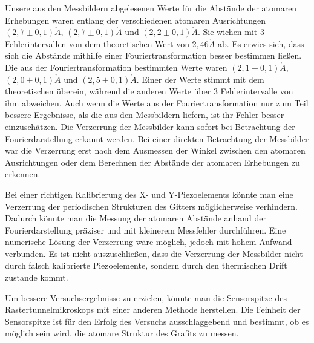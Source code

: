 \documentclass[10pt,a4paper]{article}
\begin{document}
Unsere aus den Messbildern abgelesenen Werte für die Abstände der atomaren Erhebungen waren entlang der verschiedenen atomaren Ausrichtungen $(2,7 \pm 0,1) \mathring{A}$, $(2,7 \pm 0,1) \mathring{A}$ und $(2,2 \pm 0,1) \mathring{A}$. Sie wichen mit 3 Fehlerintervallen von dem theoretischen Wert von $2,46 \mathring{A}$ ab. Es erwies sich, dass sich die Abstände mithilfe einer Fouriertransformation besser bestimmen ließen. Die aus der Fouriertransformation bestimmten Werte waren $(2,1\pm0,1)\mathring{A}$, $(2,0\pm0,1)\mathring{A}$ und $(2,5\pm0,1)\mathring{A}$. Einer der Werte stimmt mit dem theoretischen überein, während die anderen Werte über 3 Fehlerintervalle von ihm abweichen.
 Auch wenn die Werte aus der Fouriertransformation nur zum Teil bessere Ergebnisse, als die aus den Messbildern liefern, ist ihr Fehler besser einzuschätzen. Die Verzerrung der Messbilder kann sofort bei Betrachtung der Fourierdarstellung erkannt werden. Bei einer direkten Betrachtung der Messbilder war die Verzerrung erst nach dem Ausmessen der Winkel zwischen den atomaren Ausrichtungen oder dem Berechnen der Abstände der atomaren Erhebungen zu erkennen.

Bei einer richtigen Kalibrierung des X- und Y-Piezoelements könnte man eine Verzerrung der periodischen Strukturen des Gitters möglicherweise verhindern. Dadurch könnte man die Messung der atomaren Abstände anhand der Fourierdarstellung präziser und mit kleinerem Messfehler durchführen. Eine numerische Lösung der Verzerrung wäre möglich, jedoch mit hohem Aufwand verbunden.
Es ist nicht auszuschließen, dass die Verzerrung der Messbilder nicht durch falsch kalibrierte Piezoelemente, sondern durch den thermischen Drift zustande kommt.

Um bessere Versuchsergebnisse zu erzielen, könnte man die Sensorspitze des Rastertunnelmikroskops mit einer anderen Methode herstellen. Die Feinheit der Sensorspitze ist für den Erfolg des Versuchs ausschlaggebend und bestimmt, ob es möglich sein wird, die atomare Struktur des Grafits zu messen.
\end{document}
